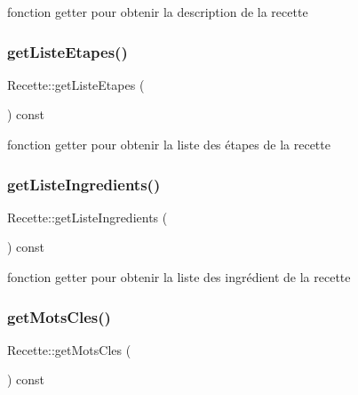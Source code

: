 fonction getter pour obtenir la description de la recette 

\mbox{\label{classRecette_a3b2807fe1f55431bcd632bff2332c6e7}} 
\subsubsection{\texorpdfstring{get\+Liste\+Etapes()}{getListeEtapes()}}
{\footnotesize\ttfamily Recette\+::get\+Liste\+Etapes (\begin{DoxyParamCaption}{ }\end{DoxyParamCaption}) const}



fonction getter pour obtenir la liste des étapes de la recette 

\mbox{\label{classRecette_a3ca29579050212dea9da71e9c1f05119}} 
\subsubsection{\texorpdfstring{get\+Liste\+Ingredients()}{getListeIngredients()}}
{\footnotesize\ttfamily Recette\+::get\+Liste\+Ingredients (\begin{DoxyParamCaption}{ }\end{DoxyParamCaption}) const}



fonction getter pour obtenir la liste des ingrédient de la recette 

\mbox{\label{classRecette_a509d4cfe5b696a08c4b6675472d6e481}} 
\subsubsection{\texorpdfstring{get\+Mots\+Cles()}{getMotsCles()}}
{\footnotesize\ttfamily Recette\+::get\+Mots\+Cles (\begin{DoxyParamCaption}{ }\end{DoxyParamCaption}) const}




